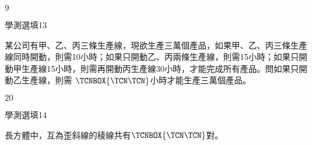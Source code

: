 \begin{QUESTIONS}
\begin{QUESTION}
\begin{QBODY}
        \end{QBODY}
        \begin{QFROMS}
        \end{QFROMS}
        \begin{QTAGS}\end{QTAGS}
        \begin{QANS}
            $9$
        \end{QANS}
        \begin{QSOLLIST}
        \end{QSOLLIST}
        \begin{QEMPTYSPACE}
        \end{QEMPTYSPACE}
    \end{QUESTION}
    \begin{QUESTION}
        \begin{ExamInfo}{87}{學測}{選填}{13}
        \end{ExamInfo}
        \begin{ExamAnsRateInfo}{}{}{}{}
        \end{ExamAnsRateInfo}
        \begin{QBODY}
            某公司有甲、乙、丙三條生產線，現欲生產三萬個產品，如果甲、乙、丙三條生產線同時開動，則需10小時；如果只開動乙、丙兩條生產線，則需15小時；如果只開動甲生產線15小時，則需再開動丙生產線30小時，才能完成所有產品。問如果只開動乙生產線，則需
            $\TCNBOX{\TCN\TCN}$小時才能生產三萬個產品。
        \end{QBODY}
        \begin{QFROMS}
        \end{QFROMS}
        \begin{QTAGS}\end{QTAGS}
        \begin{QANS}
            $20$
        \end{QANS}
        \begin{QSOLLIST}
        \end{QSOLLIST}
        \begin{QEMPTYSPACE}
        \end{QEMPTYSPACE}
    \end{QUESTION}
    \begin{QUESTION}
        \begin{ExamInfo}{87}{學測}{選填}{14}
        \end{ExamInfo}
        \begin{ExamAnsRateInfo}{}{}{}{}
        \end{ExamAnsRateInfo}
        \begin{QBODY}
            長方體中，互為歪斜線的稜線共有$\TCNBOX{\TCN\TCN}$對。


\end{QBODY}
\end{QUESTION}
\end{QUESTIONS}
